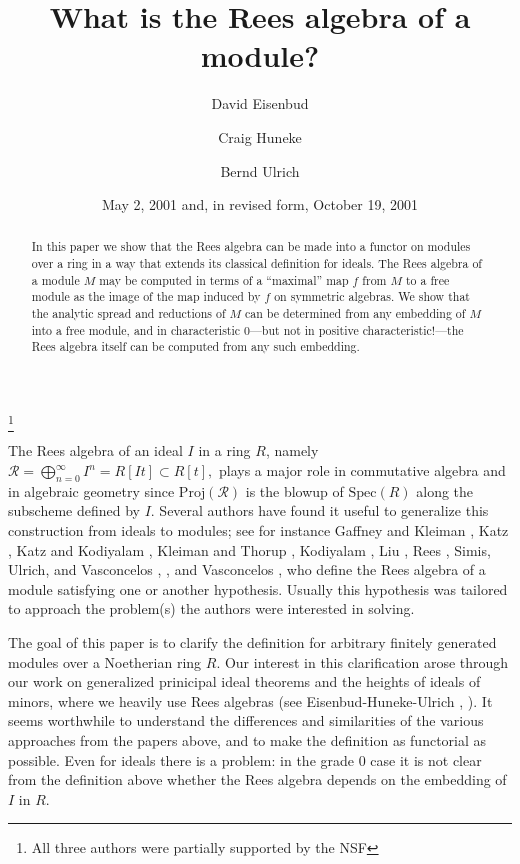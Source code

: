 \documentclass{proc-l}
\theoremstyle{plain}
\theoremstyle{definition}
\newcommand{\R}{\mathcal R}
\begin{document}
\title[Rees algebra of a module]{What is the Rees algebra of a module?}
\author{David Eisenbud}
\address{Mathematical Sciences Research Institute, 1000 Centennial Dr.,
Berkeley, California 94720}
\author{Craig Huneke}
\address{Department of Mathematics, University of Kansas, Lawrence, Kansas
66045}
\author{Bernd Ulrich}
\address{Department of Mathematics, Purdue University, West Lafayette, Indiana
47907}
\thanks{All three authors were partially supported by the NSF}
\date{May 2, 2001 and, in revised form, October 19, 2001}
\begin{abstract}
In this paper we show that the Rees algebra can be made
into a functor on modules over a ring in a way that extends its
classical definition for ideals.  The Rees algebra of a module $M$
may be computed in terms of a ``maximal'' map $f$ from $M$ to a
free module as the image of the map induced by $f$ on symmetric
algebras.  We show that the analytic spread and reductions of $M$
can be determined from any embedding of $M$ into a free module,
and in characteristic 0---but not in positive
characteristic!---the Rees algebra itself can be computed from any
such embedding.
\end{abstract}
\maketitle



The Rees algebra of an ideal $I$ in a ring $R$, namely $\R =\bigoplus _{n=0}^{\infty }I^{n}=R[It]\subset R[t], $ plays a major role
in commutative algebra and in algebraic geometry since
$\text{Proj}(\R )$ is the blowup of $\text{Spec}(R)$ along the
subscheme defined by $I$. Several authors have found it useful to
generalize this construction from ideals to modules; see for
instance Gaffney and Kleiman \cite{GK}, Katz \cite{K}, Katz and
Kodiyalam \cite{KK}, Kleiman and Thorup \cite{KT}, Kodiyalam \cite{Ko},
 Liu \cite{L}, Rees \cite{R}, Simis, Ulrich, and Vasconcelos 
\cite{SUV1}, \cite{SUV2},
and Vasconcelos \cite{V},
who define the Rees algebra of a module satisfying one or another
hypothesis. Usually this hypothesis was tailored to approach the
problem(s) the authors were interested in solving.

The goal of this paper is to clarify the definition for arbitrary
finitely generated modules over a Noetherian ring $R$. Our
interest in this clarification arose through our work on
generalized prinicipal ideal theorems and the heights of ideals of
minors, where we heavily use Rees algebras (see
Eisenbud-Huneke-Ulrich \cite{EHU1}, \cite{EHU2}). It seems worthwhile to
understand the differences and similarities of the various
approaches from the papers above, and to make the definition as
functorial as possible. Even for ideals there is a problem: in the
grade 0 case it is not clear from the definition above whether the
Rees algebra depends on the embedding of $I$ in $R$.
\end{document}
